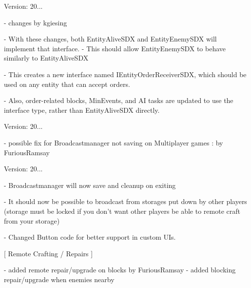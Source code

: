 Version\+: 20... \begin{DoxyVerb}
    - changes by kgiesing

    - With these changes, both EntityAliveSDX and EntityEnemySDX will implement that interface. 
        - This should allow EntityEnemySDX to behave similarly to EntityAliveSDX

        - This creates a new interface named IEntityOrderReceiverSDX, which should be used on any entity that can accept orders.

        - Also, order-related blocks, MinEvents, and AI tasks are updated to use the interface type, rather than EntityAliveSDX directly.
\end{DoxyVerb}
 Version\+: 20... \begin{DoxyVerb}

- possible fix for Broadcastmanager not saving on Multiplayer games : by FuriousRamsay
\end{DoxyVerb}
 Version\+: 20... \begin{DoxyVerb}

- Broadcastmanager will now save and cleanup on exiting

- It should now be possible to broadcast from storages put down by other players
    (storage must be locked if you don't want other players be able to remote craft from your storage)

- Changed Button code for better support in custom UIs.

[ Remote Crafting / Repairs ]

- added remote repair/upgrade on  blocks by FuriousRamsay
- added blocking repair/upgrade when enemies nearby
\end{DoxyVerb}


